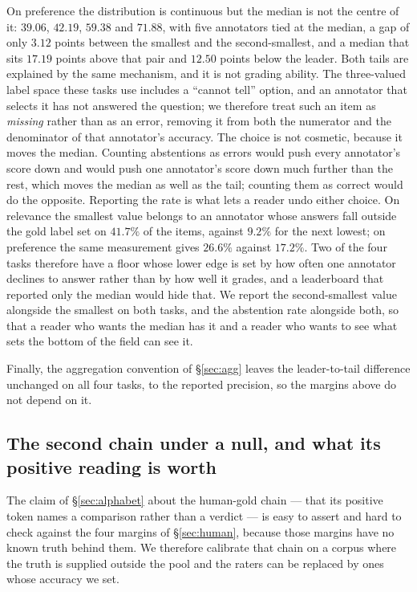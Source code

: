\documentclass{article}
\begin{document}
On preference the distribution is continuous but the median is not the centre of it: $39.06$, $42.19$, $59.38$ and $71.88$, with five annotators tied at the median, a gap of only $3.12$ points between the smallest and the second-smallest, and a median that sits $17.19$ points above that pair and $12.50$ points below the leader. Both tails are explained by the same mechanism, and it is not grading ability. The three-valued label space these tasks use includes a ``cannot tell'' option, and an annotator that selects it has not answered the question; we therefore treat such an item as \emph{missing} rather than as an error, removing it from both the numerator and the denominator of that annotator's accuracy. The choice is not cosmetic, because it moves the median. Counting abstentions as errors would push every annotator's score down and would push one annotator's score down much further than the rest, which moves the median as well as the tail; counting them as correct would do the opposite. Reporting the rate is what lets a reader undo either choice. On relevance the smallest value belongs to an annotator whose answers fall outside the gold label set on $41.7\%$ of the items, against $9.2\%$ for the next lowest; on preference the same measurement gives $26.6\%$ against $17.2\%$. Two of the four tasks therefore have a floor whose lower edge is set by how often one annotator declines to answer rather than by how well it grades, and a leaderboard that reported only the median would hide that. We report the second-smallest value alongside the smallest on both tasks, and the abstention rate alongside both, so that a reader who wants the median has it and a reader who wants to see what sets the bottom of the field can see it.

Finally, the aggregation convention of \S\ref{sec:agg} leaves the leader-to-tail difference unchanged on all four tasks, to the reported precision, so the margins above do not depend on it.

\subsection{The second chain under a null, and what its positive reading is worth}
\label{sec:poscontrol} The claim of \S\ref{sec:alphabet} about the human-gold chain --- that its positive token names a comparison rather than a verdict --- is easy to assert and hard to check against the four margins of \S\ref{sec:human}, because those margins have no known truth behind them. We therefore calibrate that chain on a corpus where the truth is supplied outside the pool and the raters can be replaced by ones whose accuracy we set.
\end{document}
